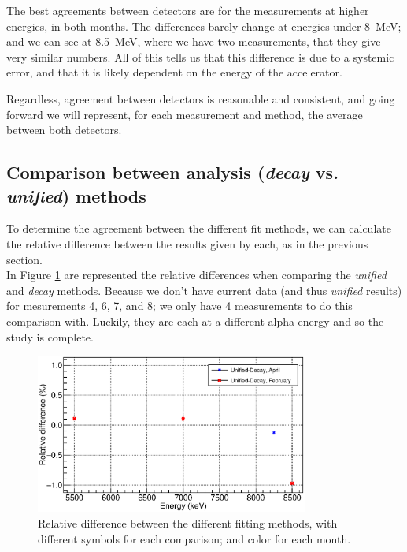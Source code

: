 \documentclass[a4paper,12pt]{report}
\begin{document}
The best agreements between detectors are for the measurements at higher energies, in both months.
The differences barely change at energies under \qty{8}{\MeV}; and we can see at \qty{8.5}{\MeV}, where we have two measurements, that they give very similar numbers.
All of this tells us that this difference is due to a systemic error, and that it is likely dependent on the energy of the accelerator.

Regardless, agreement between detectors is reasonable and consistent, and going forward we will represent, for each measurement and method, the average between both detectors.

\subsection{Comparison between analysis (\textit{decay} vs. \textit{unified}) methods}
To determine the agreement between the different fit methods, we can calculate the relative difference between the results given by each, as in the previous section.
\\

In Figure \ref{activation_method_comparison} are represented the relative differences when comparing the \textit{unified} and \textit{decay} methods.
Because we don't have current data (and thus \textit{unified} results) for mesurements 4, 6, 7, and 8; we only have 4 measurements to do this comparison with.
Luckily, they are each at a different alpha energy and so the study is complete.

\begin{figure}[H]
	\centering
	\includegraphics[width=0.80\textwidth]{activation_method_comparison.eps}
	\caption{Relative difference between the different fitting methods, with different symbols for each comparison; and color for each month.}
	\label{activation_method_comparison}
\end{figure}
\end{document}
